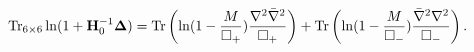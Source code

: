 \begin{equation}\label{1-dm}
{\rm Tr}_{6 \times 6}\ln (1+{\bf H}_{0}^{-1}{\bf \Delta})=
{\rm Tr}\left(\ln (1-{M\over \Box_{+}}){\nabla^{2}\bar\nabla^{2}\over
\Box_{+}}\right)+
{\rm Tr}\left(\ln (1-{M\over \Box_{-}}){\bar\nabla^{2}\nabla^{2}\over
\Box_{-}}\right).
\end{equation}

